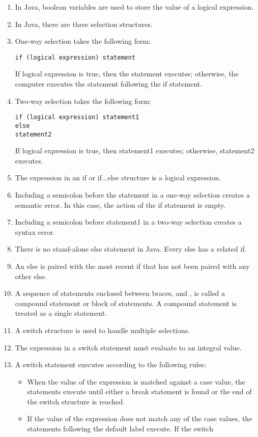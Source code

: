 \documentclass[12pt,a4paper,final,twoside,onecolumn,titlepage]{book}
\begin{document}
\begin{enumerate}
\item In Java, boolean variables are used to store the value of a logical expression.
\item In Java, there are three selection structures.
\item One-way selection takes the following form:
\begin{lstlisting}
if (logical expression) statement
\end{lstlisting}
If logical expression is true, then the statement executes; otherwise, the computer executes the statement following the if statement.
\item Two-way selection takes the following form:
\begin{lstlisting}
if (logical expression) statement1
else
statement2
\end{lstlisting}
If logical expression is true, then statement1 executes; otherwise,
statement2 executes.
\item The expression in an if or if...else structure is a logical expression.
\item Including a semicolon before the statement in a one-way selection creates a semantic error. In this case, the action of the if statement is empty.
\item Including a semicolon before statement1 in a two-way selection creates a syntax error.
\item There is no stand-alone else statement in Java. Every else has a related if.
\item An else is paired with the most recent if that has not been paired with any other else.
\item A sequence of statements enclosed between braces, { and }, is called a compound statement or block of statements. A compound statement is treated as a single statement.
\item A switch structure is used to handle multiple selections.
\item The expression in a switch statement must evaluate to an integral value.
\item A switch statement executes according to the following rules:
\begin{itemize}
\item When the value of the expression is matched against a case value, the statements execute until either a break statement is found or the end of the switch structure is reached.
\item If the value of the expression does not match any of the case values,
the statements following the default label execute. If the switch

\end{itemize}
\end{enumerate}
\end{document}
